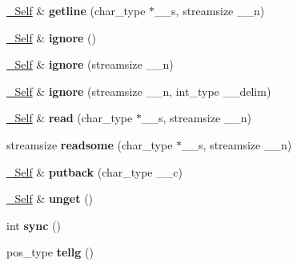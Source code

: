 \begin{DoxyCompactItemize}
\hyperlink{classbasic__istream}{\+\_\+\+Self} \& {\bfseries getline} (char\+\_\+type $\ast$\+\_\+\+\_\+s, streamsize \+\_\+\+\_\+n)
\item 
\mbox{\label{classbasic__istream_ade62115c339ff2bf19455640b02bbbe4}} 
\hyperlink{classbasic__istream}{\+\_\+\+Self} \& {\bfseries ignore} ()
\item 
\mbox{\label{classbasic__istream_ae541f510ed616493bc86262ac5ec9446}} 
\hyperlink{classbasic__istream}{\+\_\+\+Self} \& {\bfseries ignore} (streamsize \+\_\+\+\_\+n)
\item 
\mbox{\label{classbasic__istream_a45de9f7c0edf76ab9fad96678972d7c0}} 
\hyperlink{classbasic__istream}{\+\_\+\+Self} \& {\bfseries ignore} (streamsize \+\_\+\+\_\+n, int\+\_\+type \+\_\+\+\_\+delim)
\item 
\mbox{\label{classbasic__istream_abfc34967499bf2ff4719c3c4c1236ff0}} 
\hyperlink{classbasic__istream}{\+\_\+\+Self} \& {\bfseries read} (char\+\_\+type $\ast$\+\_\+\+\_\+s, streamsize \+\_\+\+\_\+n)
\item 
\mbox{\label{classbasic__istream_a3ed962a3e5d5e193c4de071dd985660e}} 
streamsize {\bfseries readsome} (char\+\_\+type $\ast$\+\_\+\+\_\+s, streamsize \+\_\+\+\_\+n)
\item 
\mbox{\label{classbasic__istream_a37f3294987a9b4c5f7d3831e08057724}} 
\hyperlink{classbasic__istream}{\+\_\+\+Self} \& {\bfseries putback} (char\+\_\+type \+\_\+\+\_\+c)
\item 
\mbox{\label{classbasic__istream_a3d30cc768130a7578e6e8cd2a0a80e84}} 
\hyperlink{classbasic__istream}{\+\_\+\+Self} \& {\bfseries unget} ()
\item 
\mbox{\label{classbasic__istream_ae5bda757d76affb6282ef54d69b977fc}} 
int {\bfseries sync} ()
\item 
\mbox{\label{classbasic__istream_a5c5d586b2a16510f027c9744ebe1475c}} 
pos\+\_\+type {\bfseries tellg} ()
\item 
\mbox{\label{classbasic__istream_a912e8361e2f712ecd5cd30445711e062}} 

\end{DoxyCompactItemize}

